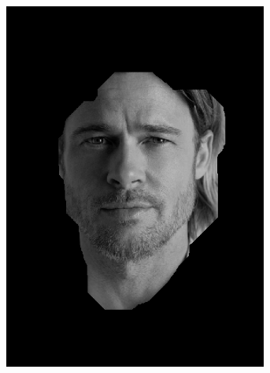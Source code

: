 \begin{figure}[H]
\centering

\begin{subfigure}{.16\textwidth}
  \centering
  \includegraphics[width=0.95\textwidth]{img/fd3/grayFaceNormall.png}
  \caption{}
\end{subfigure}%
\begin{subfigure}{.16\textwidth}
  \centering

\end{subfigure}
\end{figure}
